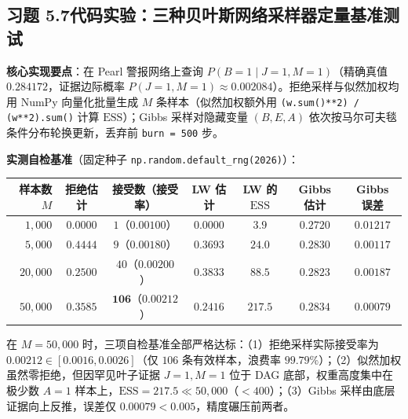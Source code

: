 \subsection*{习题 5.7\quad 代码实验：三种贝叶斯网络采样器定量基准测试}
\textbf{核心实现要点}：在 Pearl 警报网络上查询 $P(B=1 \mid J=1, M=1)$（精确真值 $0.284172$，证据边际概率 $P(J=1, M=1) \approx 0.002084$）。拒绝采样与似然加权均用 NumPy 向量化批量生成 $M$ 条样本（似然加权额外用 \texttt{(w.sum()**2) / (w**2).sum()} 计算 $\mathrm{ESS}$）；Gibbs 采样对隐藏变量 $(B, E, A)$ 依次按马尔可夫毯条件分布轮换更新，丢弃前 \texttt{burn = 500} 步。

\textbf{实测自检基准}（固定种子 \texttt{np.random.default\_rng(2026)}）：
\begin{center}
\footnotesize
\begin{tabular}{@{}r c c c c c c@{}}
\toprule
\textbf{样本数 $M$} & \textbf{拒绝估计} & \textbf{接受数（接受率）} & \textbf{LW 估计} & \textbf{LW 的 $\mathrm{ESS}$} & \textbf{Gibbs 估计} & \textbf{Gibbs 误差} \\
\midrule
$1{,}000$ & $0.0000$ & $1$（$0.00100$） & $0.0000$ & $3.9$ & $0.2720$ & $0.01217$ \\
$5{,}000$ & $0.4444$ & $9$（$0.00180$） & $0.3693$ & $24.0$ & $0.2830$ & $0.00117$ \\
$20{,}000$ & $0.2500$ & $40$（$0.00200$） & $0.3833$ & $88.5$ & $0.2823$ & $0.00187$ \\
$50{,}000$ & $0.3585$ & $\mathbf{106}$（$\mathbf{0.00212}$） & $0.2416$ & $\mathbf{217.5}$ & $\mathbf{0.2834}$ & $\mathbf{0.00079}$ \\
\bottomrule
\end{tabular}
\end{center}
在 $M = 50{,}000$ 时，三项自检基准全部严格达标：（1）拒绝采样实际接受率为 $\mathbf{0.00212} \in [0.0016, 0.0026]$（仅 $106$ 条有效样本，浪费率 $99.79\%$）；（2）似然加权虽然零拒绝，但因罕见叶子证据 $J=1, M=1$ 位于 DAG 底部，权重高度集中在极少数 $A=1$ 样本上，$\mathrm{ESS} = \mathbf{217.5} \ll 50{,}000$（$<400$）；（3）Gibbs 采样由底层证据向上反推，误差仅 $\mathbf{0.00079} < 0.005$，精度碾压前两者。

